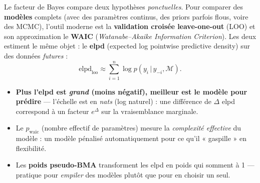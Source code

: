 \documentclass[11pt,a4paper]{article}
\newcommand{\given}{\,\vert\,}
\begin{document}
\begin{rappel}
Le facteur de Bayes compare deux hypothèses \emph{ponctuelles}. Pour
comparer des \textbf{modèles} complets (avec des paramètres continus, des
priors parfois flous, voire des MCMC), l'outil moderne est la
\textbf{validation croisée leave-one-out} (LOO) et son approximation le
\textbf{WAIC} (\emph{Watanabe--Akaike Information Criterion}). Les deux
estiment le même objet : le \textbf{elpd} (expected log pointwise predictive
density) sur des données \emph{futures} :
\[
\text{elpd}_{\text{loo}} \approx \sum_{i=1}^{n}
\log p(y_i \given y_{-i}, \mathcal{M}).
\]
\begin{itemize}[leftmargin=4mm, itemsep=0.5mm]
  \item \textbf{Plus l'elpd est \emph{grand} (moins négatif), meilleur est le
        modèle pour prédire} --- l'échelle est en \emph{nats} (log naturel) :
        une différence de $\Delta$ elpd correspond à un facteur
        $e^{\Delta}$ sur la vraisemblance marginale.
  \item Le \textbf{$p_{\text{waic}}$} (nombre effectif de paramètres) mesure
        la \emph{complexité effective} du modèle : un modèle pénalisé
        automatiquement pour ce qu'il « gaspille » en flexibilité.
  \item Les \textbf{poids pseudo-BMA} transforment les elpd en poids qui
        somment à 1 --- pratique pour \emph{empiler} des modèles plutôt que
        pour en choisir un seul.
\end{itemize}
\end{rappel}
\end{document}
